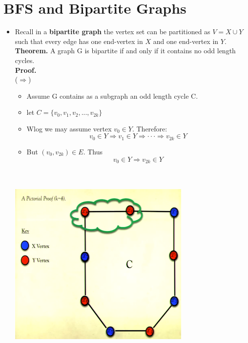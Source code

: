 \documentclass[12pt]{article}
\begin{document}
\section{BFS and Bipartite Graphs}
\renewcommand{\labelitemii}{$\circ$}
\renewcommand{\labelitemiii}{$\cdot$}
\renewcommand{\labelitemiii}{$\rightarrow$}
\renewcommand{\labelitemiv}{$\star$}
\begin{itemize}
\item Recall in a \textbf{bipartite graph} the vertex set can be partitioned as $V = X \cup Y$ such that every edge has one end-vertex in $X$ and one end-vertex in $Y$.\\

\textbf{Theorem.}  A graph G is bipartite if and only if it contains no odd length cycles.\\
\textbf{Proof.}\\
($\Rightarrow$)
	\begin{itemize}
	\item Assume G contains as a subgraph an odd length cycle C.
	\item let $C = \{v_0, v_1, v_2, ... , v_{2k} \}$
	\item Wlog we may assume vertex $v_0 \in Y$. Therefore:\\
	$$v_0 \in Y \Rightarrow v_1 \in Y \Rightarrow \cdot \cdot \cdot \Rightarrow v_{2k} \in Y$$
	\item But $(v_0, v_{2k}) \in E $. Thus\\
	$$v_0 \in Y \Rightarrow  v_{2k} \in Y$$
	\\
	\\
	\end{itemize}
\begin{center}
\includegraphics{lecture84}
\end{center}


\end{itemize}
\end{document}

